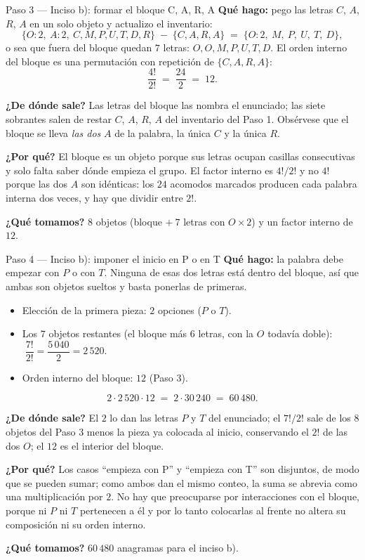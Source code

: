 \documentclass[11pt]{article}
\begin{document}
\begin{paso}{Paso 3 --- Inciso b): formar el bloque C, A, R, A}
\textbf{Qué hago:} pego las letras $C$, $A$, $R$, $A$ en un solo objeto y actualizo el inventario:
\[
\{O{:}2,\ A{:}2,\ C,M,P,U,T,D,R\}\;-\;\{C,A,R,A\} \;=\; \{O{:}2,\ M,\ P,\ U,\ T,\ D\},
\]
o sea que fuera del bloque quedan $7$ letras: $O,O,M,P,U,T,D$. El orden interno del bloque es una permutación
con repetición de $\{C,A,R,A\}$:
\[
\frac{4!}{2!} \;=\; \frac{24}{2} \;=\; 12 .
\]

\textbf{¿De dónde sale?} Las letras del bloque las nombra el enunciado; las siete sobrantes salen de restar
$C$, $A$, $R$, $A$ del inventario del Paso 1. Obsérvese que el bloque se lleva \emph{las dos} $A$ de la
palabra, la única $C$ y la única $R$.

\textbf{¿Por qué?} El bloque es un objeto porque sus letras ocupan casillas consecutivas y solo falta saber
dónde empieza el grupo. El factor interno es $4!/2!$ y no $4!$ porque las dos $A$ son idénticas: los $24$
acomodos marcados producen cada palabra interna dos veces, y hay que dividir entre $2!$.

\textbf{¿Qué tomamos?} $8$ objetos (bloque $+\ 7$ letras con $O\times2$) y un factor interno de $12$.
\end{paso}

\begin{paso}{Paso 4 --- Inciso b): imponer el inicio en P o en T}
\textbf{Qué hago:} la palabra debe empezar con $P$ o con $T$. Ninguna de esas dos letras está dentro del
bloque, así que ambas son objetos sueltos y basta ponerlas de primeras.
\begin{itemize}[leftmargin=1.4em]
\item Elección de la primera pieza: $2$ opciones ($P$ o $T$).
\item Los $7$ objetos restantes (el bloque más $6$ letras, con la $O$ todavía doble):
$\;\dfrac{7!}{2!}=\dfrac{5\,040}{2}=2\,520$.
\item Orden interno del bloque: $12$ (Paso 3).
\end{itemize}
\[
2\cdot 2\,520\cdot 12 \;=\; 2\cdot 30\,240 \;=\; 60\,480 .
\]

\textbf{¿De dónde sale?} El $2$ lo dan las letras $P$ y $T$ del enunciado; el $7!/2!$ sale de los $8$ objetos
del Paso 3 menos la pieza ya colocada al inicio, conservando el $2!$ de las dos $O$; el $12$ es el interior
del bloque.

\textbf{¿Por qué?} Los casos ``empieza con P'' y ``empieza con T'' son disjuntos, de modo que se pueden
sumar; como ambos dan el mismo conteo, la suma se abrevia como una multiplicación por $2$. No hay que
preocuparse por interacciones con el bloque, porque ni $P$ ni $T$ pertenecen a él y por lo tanto colocarlas
al frente no altera su composición ni su orden interno.

\textbf{¿Qué tomamos?} $60\,480$ anagramas para el inciso b).
\end{paso}
\end{document}
